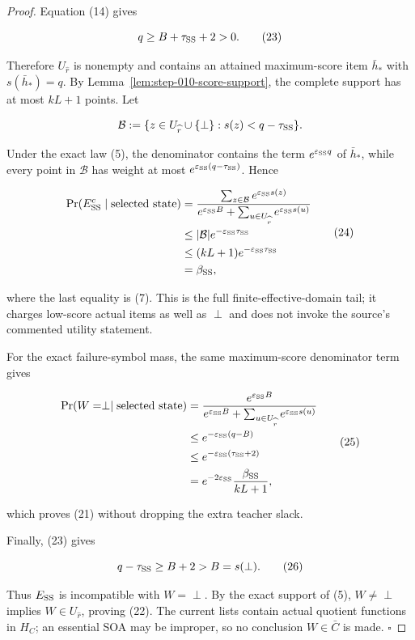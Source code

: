 \begin{proof}
Equation (14) gives

\[
 q\geq B+\tau_{\rm SS}+2>0.
 \tag{23}
\]

Therefore \(U_{\widehat r}\) is nonempty and contains an attained
maximum-score item \(\bar h_*\) with \(s(\bar h_*)=q\). By
Lemma~\ref{lem:step-010-score-support}, the complete support has at most
\(kL+1\) points. Let

\[
 \mathcal B
 :=\{z\in U_{\widehat r}\cup\{\perp\}:
          s(z)<q-\tau_{\rm SS}\}.
\]

Under the exact law (5), the denominator contains the term
\(e^{\varepsilon_{\rm SS}q}\) of \(\bar h_*\), while every point in
\(\mathcal B\) has weight at most
\(e^{\varepsilon_{\rm SS}(q-\tau_{\rm SS})}\). Hence

\[
\begin{aligned}
 \Pr(E_{\rm SS}^c\mid\text{selected state})
 &=\frac{\sum_{z\in\mathcal B}
             e^{\varepsilon_{\rm SS}s(z)}}
          {e^{\varepsilon_{\rm SS}B}
           +\sum_{u\in U_{\widehat r}}
              e^{\varepsilon_{\rm SS}s(u)}}\\
 &\leq |\mathcal B|e^{-\varepsilon_{\rm SS}\tau_{\rm SS}}\\
 &\leq(kL+1)e^{-\varepsilon_{\rm SS}\tau_{\rm SS}}\\
 &=\beta_{\rm SS},
\end{aligned}
 \tag{24}
\]

where the last equality is (7). This is the full finite-effective-domain
tail; it charges low-score actual items as well as \(\perp\) and does not
invoke the source's commented utility statement.

For the exact failure-symbol mass, the same maximum-score denominator term
gives

\[
\begin{aligned}
 \Pr(W=\perp\mid\text{selected state})
 &=\frac{e^{\varepsilon_{\rm SS}B}}
         {e^{\varepsilon_{\rm SS}B}
          +\sum_{u\in U_{\widehat r}}
             e^{\varepsilon_{\rm SS}s(u)}}\\
 &\leq e^{-\varepsilon_{\rm SS}(q-B)}\\
 &\leq e^{-\varepsilon_{\rm SS}(\tau_{\rm SS}+2)}\\
 &=e^{-2\varepsilon_{\rm SS}}
   \frac{\beta_{\rm SS}}{kL+1},
\end{aligned}
 \tag{25}
\]

which proves (21) without dropping the extra teacher slack.

Finally, (23) gives

\[
 q-\tau_{\rm SS}\geq B+2>B=s(\perp).
 \tag{26}
\]

Thus \(E_{\rm SS}\) is incompatible with \(W=\perp\). By the exact support
of (5), \(W\ne\perp\) implies \(W\in U_{\widehat r}\), proving (22). The
current lists contain actual quotient functions in \(H_C\); an essential
SOA may be improper, so no conclusion \(W\in\bar C\) is made. \(\square\)


\end{proof}

